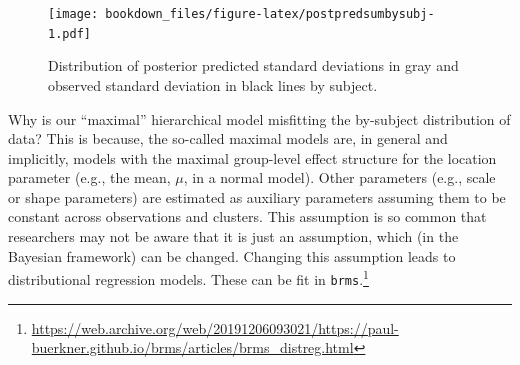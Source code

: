 \documentclass[12pt,]{krantz}
\newenvironment{Shaded}{\begin{snugshade}}{\end{snugshade}}
\newcommand{\CommentTok}[1]{\textcolor[rgb]{0.56,0.35,0.01}{\textit{#1}}}
\newcommand{\DataTypeTok}[1]{\textcolor[rgb]{0.13,0.29,0.53}{#1}}
\newcommand{\DecValTok}[1]{\textcolor[rgb]{0.00,0.00,0.81}{#1}}
\newcommand{\KeywordTok}[1]{\textcolor[rgb]{0.13,0.29,0.53}{\textbf{#1}}}
\newcommand{\NormalTok}[1]{#1}
\newcommand{\OperatorTok}[1]{\textcolor[rgb]{0.81,0.36,0.00}{\textbf{#1}}}
\newcommand{\OtherTok}[1]{\textcolor[rgb]{0.56,0.35,0.01}{#1}}
\newcommand{\StringTok}[1]{\textcolor[rgb]{0.31,0.60,0.02}{#1}}
\theoremstyle{definition}
\theoremstyle{definition}
\theoremstyle{definition}
\theoremstyle{remark}
\begin{document}
\begin{Shaded}
\end{Shaded}

\begin{figure}
\centering
\texttt{[image: bookdown\_files/figure-latex/postpredsumbysubj-1.pdf]}
\caption{\label{fig:postpredsumbysubj}Distribution of posterior predicted standard deviations in gray and observed standard deviation in black lines by subject.}
\end{figure}

Why is our ``maximal'' hierarchical model misfitting the by-subject distribution of data? This is because, the so-called maximal models are, in general and implicitly, models with the maximal group-level effect structure for the location parameter (e.g., the mean, \(\mu\), in a normal model). Other parameters (e.g., scale or shape parameters) are estimated as auxiliary parameters assuming them to be constant across observations and clusters. This assumption is so common that researchers may not be aware that it is just an assumption, which (in the Bayesian framework) can be changed. Changing this assumption leads to distributional regression models. These can be fit in \texttt{brms}.\footnote{\url{https://web.archive.org/web/20191206093021/https://paul-buerkner.github.io/brms/articles/brms_distreg.html}}
\end{document}
